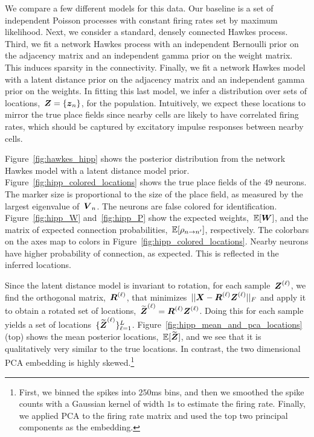 We compare a few different models for this data. Our baseline is a set
of independent Poisson processes with constant firing rates set by
maximum likelihood. Next, we consider a standard, densely connected
Hawkes process.  Third, we fit a network Hawkes process with an
independent Bernoulli prior on the adjacency matrix and an independent
gamma prior on the weight matrix. This induces sparsity in the
connectivity. Finally, we fit a network Hawkes model with a latent
distance prior on the adjacency matrix and an independent gamma prior
on the weights. In fitting this last model, we infer a distribution
over sets of locations,~${\boldsymbol{Z} = \{\boldsymbol{z}_n\}}$, for the population.
Intuitively, we expect these locations to mirror the true place fields
since nearby cells are likely to have correlated firing rates, which
should be captured by excitatory impulse responses between nearby
cells.

Figure~\ref{fig:hawkes_hipp} shows the posterior distribution from the
network Hawkes model with a latent distance model prior.
Figure~\ref{fig:hipp_colored_locations} shows the true place fields of the $49$
neurons.  The marker size is proportional to the size of the place
field, as measured by the largest eigenvalue of~$\boldsymbol{V}_n$. The neurons
are false colored for identification.
Figure~\ref{fig:hipp_W} and~\ref{fig:hipp_P} show the expected weights,~$\mathbb{E}[\boldsymbol{W}]$,
and the matrix of expected connection probabilities,~$\mathbb{E}[\rho_{n \to n'}]$,
respectively. The colorbars on the axes map to colors in Figure~\ref{fig:hipp_colored_locations}. Nearby neurons have higher probability of connection, as expected.
This is reflected in the inferred locations.

Since the
latent distance model is invariant to rotation, for each
sample~$\boldsymbol{Z}^{(\ell)}$, we find the orthogonal matrix,~$\boldsymbol{R}^{(\ell)}$,
that minimizes~${||\boldsymbol{X} - \boldsymbol{R}^{(\ell)} \boldsymbol{Z}^{(\ell)}||_F}$ and apply it
to obtain a rotated set of locations,~${\widetilde{\boldsymbol{Z}}^{(\ell)} =
  \boldsymbol{R}^{(\ell)} \boldsymbol{Z}^{(\ell)}}$.  Doing this for each sample yields a
set of locations~$\{\widetilde{\boldsymbol{Z}}^{(\ell)}\}_{\ell=1}^L$.
Figure~\ref{fig:hipp_mean_and_pca_locations} (top) shows the mean
posterior locations,~$\mathbb{E}[\widetilde{\boldsymbol{Z}}]$, and we see that it
is qualitatively very similar to the true locations. In contrast,
the two dimensional PCA embedding is highly skewed.\footnote{First, we binned the
  spikes into $250$ms bins, and then we smoothed the spike counts
  with a Gaussian kernel of width $1$s to estimate the firing rate.
  Finally, we applied PCA to the firing rate matrix and used the
  top two principal components as the embedding.}

